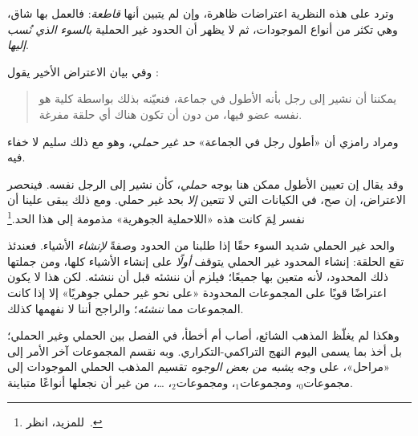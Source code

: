 \documentclass[../../../include/open-logic-section]{subfiles}
\begin{document}
وترد على هذه النظرية اعتراضات ظاهرة، وإن لم يتبين أنها \emph{قاطعة}:
فالعمل بها شاق، وهي تكثر من أنواع الموجودات، ثم لا يظهر أن الحدود غير
الحملية \emph{بالسوء الذي نُسب إليها}.
	
وفي بيان الاعتراض الأخير يقول
\citeauthor{Ramsey1925}:
\begin{quote}
	يمكننا أن نشير إلى رجل بأنه الأطول في جماعة، فنعيّنه بذلك بواسطة
	كلية هو نفسه عضو فيها، من دون أن تكون هناك أي حلقة مفرغة.
	\citep{Ramsey1925}
\end{quote}
ومراد رامزي أن «أطول رجل في الجماعة» \emph{حد غير حملي}، وهو مع ذلك
سليم لا خفاء فيه.

وقد يقال إن تعيين الأطول ممكن هنا بوجه \emph{حملي}، كأن نشير إلى الرجل
نفسه. فينحصر الاعتراض، إن صح، في الكيانات التي لا تتعين \emph{إلا}
بحد غير حملي. ومع ذلك يبقى علينا أن نفسر لِمَ كانت هذه «اللاحملية
الجوهرية» مذمومة إلى هذا الحد.\footnote{للمزيد، انظر~\citet{Linnebo2010}.}

والحد غير الحملي شديد السوء حقًا إذا طلبنا من الحدود وصفةً
\emph{لإنشاء} الأشياء. فعندئذ تقع الحلقة: إنشاء المحدود غير الحملي
يتوقف \emph{أولًا} على إنشاء الأشياء كلها، ومن جملتها ذلك المحدود،
لأنه متعين بها جميعًا؛ فيلزم أن ننشئه قبل أن ننشئه. لكن هذا لا يكون
اعتراضًا قويًا على المجموعات المحدودة «على نحو غير حملي جوهريًا» إلا
إذا كانت المجموعات مما \emph{ننشئه}؛ والراجح أننا لا نفهمها كذلك.

وهكذا لم يغلّظ المذهب الشائع، أصاب أم أخطأ، في الفصل بين الحملي وغير
الحملي؛ بل أخذ بما يسمى اليوم النهج التراكمي-التكراري. وبه نقسم
المجموعات آخر الأمر إلى «مراحل»، على وجه \emph{يشبه من بعض الوجوه}
تقسيم المذهب الحملي الموجودات إلى مجموعات$_0$، ومجموعات$_1$،
ومجموعات$_2$، \ldots، من غير أن نجعلها أنواعًا متباينة.
\end{document}
